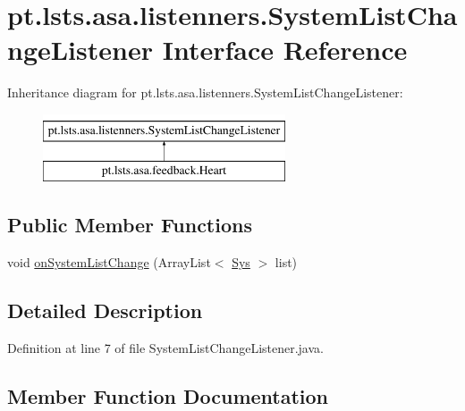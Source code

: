 \hypertarget{interfacept_1_1lsts_1_1asa_1_1listenners_1_1SystemListChangeListener}{}\section{pt.\+lsts.\+asa.\+listenners.\+System\+List\+Change\+Listener Interface Reference}
\label{interfacept_1_1lsts_1_1asa_1_1listenners_1_1SystemListChangeListener}
Inheritance diagram for pt.\+lsts.\+asa.\+listenners.\+System\+List\+Change\+Listener\+:\begin{figure}[H]
\begin{center}
\leavevmode
\includegraphics[height=2.000000cm]{interfacept_1_1lsts_1_1asa_1_1listenners_1_1SystemListChangeListener}
\end{center}
\end{figure}
\subsection*{Public Member Functions}
\begin{DoxyCompactItemize}
\item 
void \hyperlink{interfacept_1_1lsts_1_1asa_1_1listenners_1_1SystemListChangeListener_aaa28b7a99a73a6c19a9b45cc2b7dece9}{on\+System\+List\+Change} (Array\+List$<$ \hyperlink{classpt_1_1lsts_1_1asa_1_1sys_1_1Sys}{Sys} $>$ list)
\end{DoxyCompactItemize}


\subsection{Detailed Description}


Definition at line 7 of file System\+List\+Change\+Listener.\+java.



\subsection{Member Function Documentation}
\hypertarget{interfacept_1_1lsts_1_1asa_1_1listenners_1_1SystemListChangeListener_aaa28b7a99a73a6c19a9b45cc2b7dece9}{}

